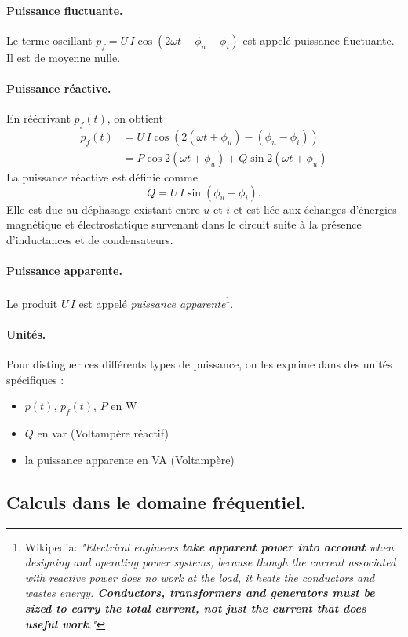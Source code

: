 		
\paragraph{Puissance fluctuante.} 
Le terme oscillant $p_f=U\,I\cos(2\omega t+\phi_u+\phi_i)$ est appelé puissance fluctuante. Il est de moyenne nulle.

\paragraph{Puissance réactive.}
En réécrivant $p_f(t)$, on obtient
\begin{align*}
	p_f(t)& = U\,I\cos (2(\omega t + \phi_u)-(\phi_u-\phi_i))\\
	& = P \cos 2(\omega t+\phi_u) + Q \sin 2(\omega t+\phi_u)
\end{align*}
La puissance réactive est définie comme 
\[Q = U\,I\sin (\phi_u-\phi_i).\]
Elle est due au déphasage existant entre $u$ et $i$ et est liée aux échanges d'énergies magnétique et électrostatique survenant dans le circuit suite à la présence d'inductances et de condensateurs. 


\paragraph{Puissance apparente.}
Le produit $U\,I$ est appelé {\em puissance apparente}\footnote{Wikipedia: \textit{"Electrical engineers \textbf{take apparent power into account} when designing and operating power systems, because though the current associated with reactive power does no work at the load, it heats the conductors and wastes energy. \textbf{Conductors, transformers and generators must be sized to carry the total current, not just the current that does useful work}."}}.

\paragraph{Unités.}
Pour distinguer ces différents types de puissance, on les exprime dans des unités spécifiques : 
		\begin{itemize}
	\item $p(t)$, $p_f(t)$, $P$ en W
	\item $Q$ en var (Voltampère réactif)
	\item la puissance apparente en VA (Voltampère)
\end{itemize}

\subsection{Calculs dans le domaine fréquentiel.}


